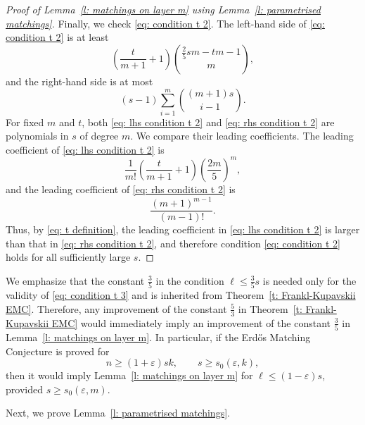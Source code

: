\documentclass{article}
\begin{document}
\begin{proof}[Proof of Lemma~\ref{l: matchings on layer m} using Lemma~\ref{l: parametrised matchings}]
Finally, we check \eqref{eq: condition t 2}. The left-hand side of \eqref{eq: condition t 2} is at least
\begin{equation} \label{eq: lhs condition t 2}
    \left(\frac{t}{m+1} + 1\right){\frac{2}{5}sm - tm-1 \choose m},
\end{equation}
and the right-hand side is at most
\begin{equation} \label{eq: rhs condition t 2}
    (s-1)\sum_{i=1}^{m}{(m+1)s \choose i-1}.
\end{equation}
For fixed $m$ and $t$, both \eqref{eq: lhs condition t 2} and \eqref{eq: rhs condition t 2} are polynomials in $s$ of degree $m$. We compare their leading coefficients. The leading coefficient of \eqref{eq: lhs condition t 2} is
\[
\frac{1}{m!}\left(\frac{t}{m+1} + 1\right)\left(\frac{2m}{5}\right)^m,
\]
and the leading coefficient of \eqref{eq: rhs condition t 2} is
\[
\frac{(m+1)^{m-1}}{(m-1)!}.
\]
Thus, by \eqref{eq: t definition}, the leading coefficient in \eqref{eq: lhs condition t 2} is larger than that in \eqref{eq: rhs condition t 2}, and therefore condition \eqref{eq: condition t 2} holds for all sufficiently large $s$.
\end{proof}

We emphasize that the constant $\frac{3}{5}$ in the condition $\ell \leq \frac{3}{5}s$ is needed only for the validity of \eqref{eq: condition t 3} and is inherited from Theorem~\ref{t: Frankl-Kupavskii EMC}. Therefore, any improvement of the constant $\frac{5}{3}$ in Theorem~\ref{t: Frankl-Kupavskii EMC} would immediately imply an improvement of the constant $\frac{3}{5}$ in Lemma~\ref{l: matchings on layer m}. In particular, if the Erd\H{o}s Matching Conjecture is proved for
\[
n \geq (1 + \varepsilon)sk, \qquad s \geq s_0(\varepsilon, k),
\]
then it would imply Lemma~\ref{l: matchings on layer m} for $\ell \leq (1 - \varepsilon)s$, provided $s \geq s_0(\varepsilon, m)$.


Next, we prove Lemma~\ref{l: parametrised matchings}.
\end{document}
